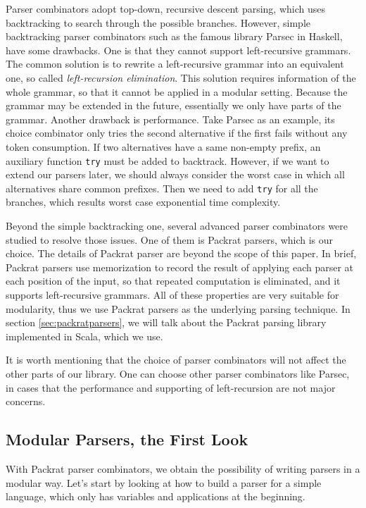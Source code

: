 Parser combinators adopt top-down, recursive descent parsing, which uses backtracking to search through the possible branches. However, simple backtracking parser combinators such as the famous library Parsec in Haskell, have some drawbacks. One is that they cannot support left-recursive grammars. The common solution is to rewrite a left-recursive grammar into an equivalent one, so called \textit{left-recursion elimination}. This solution requires information of the whole grammar, so that it cannot be applied in a modular setting. Because the grammar may be extended in the future, essentially we only have parts of the grammar. Another drawback is performance. Take Parsec as an example, its choice combinator only tries the second alternative if the first fails without any token consumption. If two alternatives have a same non-empty prefix, an auxiliary function \lstinline{try} must be added to backtrack. However, if we want to extend our parsers later, we should always consider the worst case in which all alternatives share common prefixes. Then we need to add \lstinline{try} for all the branches, which results worst case exponential time complexity.

Beyond the simple backtracking one, several advanced parser combinators were studied to resolve those issues. One of them is Packrat parsers, which is our choice. The details of Packrat parser are beyond the scope of this paper. In brief, Packrat parsers use memorization to record the result of applying each parser at each position of the input, so that repeated computation is eliminated, and it supports left-recursive grammars. All of these properties are very suitable for modularity, thus we use Packrat parsers as the underlying parsing technique. In section \ref{sec:packratparsers}, we will talk about the Packrat parsing library implemented in Scala, which we use.

It is worth mentioning that the choice of parser combinators will not affect the other parts of our library. One can choose other parser combinators like Parsec, in cases that the performance and supporting of left-recursion are not major concerns.

\subsection{Modular Parsers, the First Look}\label{subsec:overview-firstlook}

With Packrat parser combinators, we obtain the possibility of writing parsers in a modular way. Let's start by looking at how to build a parser for a simple language, which only has variables and applications at the beginning.

